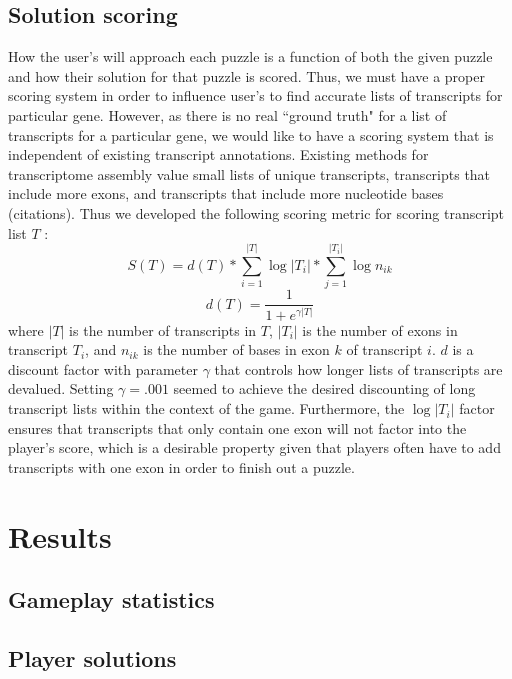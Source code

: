 \documentclass[12pt]{article}
\begin{document}
\subsection*{Solution scoring}
How the user's will approach each puzzle is a function of both the given puzzle and how their solution for that puzzle is scored. Thus, we must have
a proper scoring system in order to influence user's to find accurate lists of transcripts for particular gene. However, as there is no real ``ground truth"
for a list of transcripts for a particular gene, we would like to have a scoring system that is independent of existing transcript annotations. Existing methods
for transcriptome assembly value small lists of unique transcripts, transcripts that include more exons, and transcripts that include more nucleotide bases (citations).
Thus we developed the following scoring metric for scoring transcript list $T$ :
\begin{equation*}
S(T) = d(T) * \sum_{i=1}^{|T|} \log{|T_i|} * \sum_{j = 1}^{|T_i|} \log{n_{ik}}
\end{equation*}
\begin{equation*}
d(T) = \frac{1}{1+e^{\gamma |T|}}
\end{equation*}
where $|T|$ is the number of transcripts in $T$, $|T_i|$ is the number of exons in transcript $T_i$, and $n_{ik}$ is the number of bases in exon $k$ of transcript $i$.
$d$ is a discount factor with parameter $\gamma$ that controls how longer lists of transcripts are devalued. Setting $\gamma = .001$ seemed to achieve the desired
discounting of long transcript lists within the context of the game. Furthermore, the $\log{|T_i|}$ factor ensures that transcripts that only contain one exon will not factor
into the player's score, which is a desirable property given that players often have to add transcripts with one exon in order to finish out a puzzle.

\section*{Results}

\subsection*{Gameplay statistics}

\subsection*{Player solutions}
\end{document}
